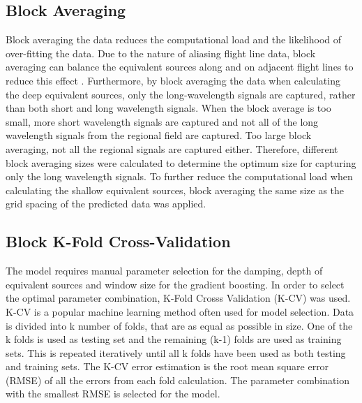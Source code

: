 \subsection{Block Averaging}
Block averaging the data reduces the computational load and the likelihood of over-fitting the data. Due to the nature of aliasing flight line data, block averaging can balance the equivalent sources along and on adjacent flight lines to reduce this effect \citep{SolerUieda2021}. Furthermore, by block averaging the data when calculating the deep equivalent sources, only the long-wavelength signals are captured, rather than both short and long wavelength signals. When the block average is too small, more short wavelength signals are captured and not all of the long wavelength signals from the regional field are captured. Too large block averaging, not all the regional signals are captured either. Therefore, different block averaging sizes were calculated to determine the optimum size for capturing only the long wavelength signals. To further reduce the computational load when calculating the shallow equivalent sources, block averaging the same size as the grid spacing of the predicted data was applied.

\subsection{Block K-Fold Cross-Validation}
The model requires manual parameter selection for the damping, depth of equivalent sources and window size for the gradient boosting. In order to select the optimal parameter combination, K-Fold Crosss Validation (K-CV) was used. K-CV is a popular machine learning method often used for model selection. Data is divided into k number of folds, that are as equal as possible in size. One of the k folds is used as testing set and the remaining (k-1) folds are used as training sets. This is repeated iteratively until all k folds have been used as both testing and training sets. The K-CV error estimation is the root mean square error (RMSE) of all the errors from each fold calculation. The parameter combination with the smallest RMSE is selected for the model.

